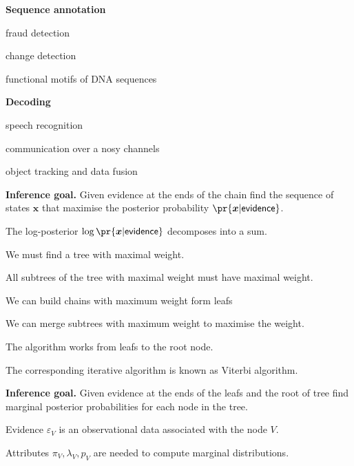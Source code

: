 \documentclass[landscape,footrule]{foils}
\renewcommand{\vec}[1]{\boldsymbol{#1}}
\begin{document}
\textbf{Sequence annotation}
\begin{triangles}
\item fraud detection
\item change detection 
\item functional motifs of DNA sequences
\end{triangles}\vspace*{2ex}


\textbf{Decoding}
\begin{triangles}
\item speech recognition
\item communication over a nosy channels 
\item object tracking and data fusion
\end{triangles}



\textbf{Inference goal.}
Given evidence at the ends of the chain find the sequence of states $\vec{x}$ that maximise the posterior probability $\pr{\vec{x}|\mathsf{evidence}}$.
\begin{triangles}
\item The log-posterior $\log\pr{\vec{x}|\mathsf{evidence}}$ decomposes into a sum.
\item We must find a tree with maximal weight.
\end{triangles}



All subtrees of the tree with maximal weight must have maximal weight. 
\begin{triangles}
\item We can build chains with maximum weight form leafs
\item We can merge subtrees with maximum weight to maximise the weight.
\item The algorithm works from leafs to the root node.
\item The corresponding iterative algorithm is known as Viterbi algorithm.
\end{triangles}




\textbf{Inference goal.}
Given evidence at the ends of the leafs and the root of tree find marginal posterior probabilities for each node in the tree.
\begin{triangles}
\item Evidence $\varepsilon_V$ is an observational data associated with the node $V$.
\item Attributes $\pi_V, \lambda_V, p_V$ are needed to compute marginal distributions. 
\end{triangles}
\end{document}
